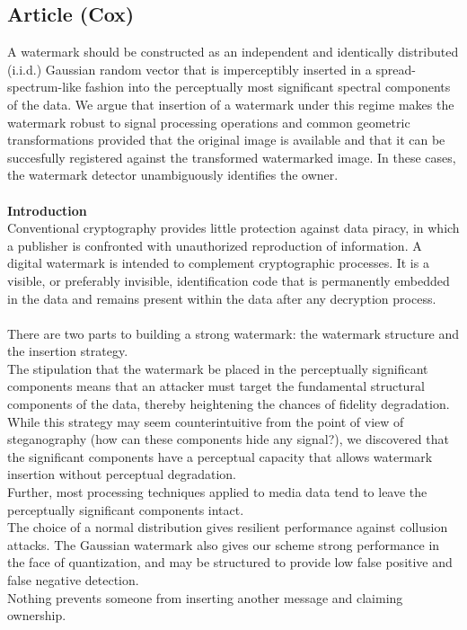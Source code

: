 \documentclass[10pt,a4paper]{book}
\begin{document}
\subsection{Article (Cox)}
A watermark should be constructed as an independent and identically distributed (i.i.d.) Gaussian random vector that is imperceptibly inserted in a spread-spectrum-like fashion into the perceptually most significant spectral components of the data. We argue that insertion of a watermark under this regime makes the watermark robust to signal processing operations and common geometric transformations provided that the original image is available and that it can be succesfully registered against the transformed watermarked image. In these cases, the watermark detector unambiguously identifies the owner.\\\\
\textbf{Introduction}\\
Conventional cryptography provides little protection against data piracy, in which a publisher is confronted with unauthorized reproduction of information. A digital watermark is intended to complement cryptographic processes. It is a visible, or preferably invisible, identification code that is permanently embedded in the data and remains present within the data after any decryption process.\\\\
There are two parts to building a strong watermark: the watermark structure and the insertion strategy.\\
The stipulation that the watermark be placed in the perceptually significant components means that an attacker must target the fundamental structural components of the data, thereby heightening the chances of fidelity degradation. While this strategy may seem counterintuitive from the point of view of steganography (how can these components hide any signal?), we discovered that the significant components have a perceptual capacity that allows watermark insertion without 
perceptual degradation.\\
Further, most processing techniques applied to media data tend to leave the perceptually significant 
components intact.\\
The choice of a normal distribution gives resilient performance against collusion attacks. The Gaussian watermark also gives our scheme strong performance in the face of quantization, and may be structured to provide low false positive and false negative detection.\\
Nothing prevents someone from inserting another message and claiming ownership.
\end{document}
